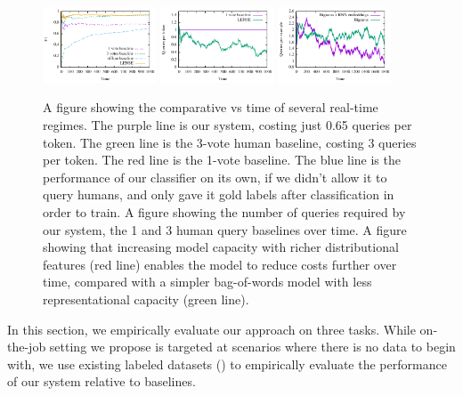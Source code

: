 \begin{figure}[t]
  \begin{centering}
  \includegraphics[width=0.3\textwidth]{figures/ner_2_class/f1_plot/f1_vs_time.pdf}
  \includegraphics[width=0.3\textwidth]{figures/ner_2_class/cost_plot/cost_vs_time.pdf}
  \includegraphics[width=0.3\textwidth]{figures/sentiment_cost_per_token_vs_time/cost_per_token_vs_time.pdf}
  \end{centering}
  \caption{A figure showing the comparative \fone vs time of several real-time regimes. The purple line is our system, costing just 0.65 queries per token. The green line is the 3-vote human baseline, costing 3 queries per token. The red line is the 1-vote baseline. The blue line is the performance of our classifier on its own, if we didn't allow it to query humans, and only gave it gold labels after classification in order to train.
           A figure showing the number of queries required by our system, the 1 and 3 human query baselines over time.
           A figure showing that increasing model capacity with richer distributional features (red line) enables the model to reduce costs further over time, compared with a simpler bag-of-words model with less representational capacity (green line).}
\end{figure}



In this section, we empirically evaluate our approach on three tasks. 
While on-the-job setting we propose is targeted at scenarios where there is no data to begin with, we use existing labeled datasets () to empirically evaluate the performance of our system relative to baselines.


